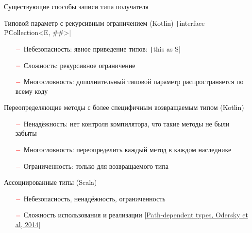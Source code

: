 \documentclass[usenames, dvipsnames]{beamer}
\begin{document}
\begin{frame}[fragile]{Существующие способы записи типа получателя}
        \begin{block}{Типовой параметр с рекурсивным ограничением (Kotlin)}
            \texttt|interface PCollection<E, ##>|
            \begin{itemize}
                \item[$\color{red} -$] Небезопасность: явное приведение типов: \texttt|this as S|
                \item[$\color{red} -$] Сложность: рекурсивное ограничение
                \item[$\color{red} -$] Многословность: дополнительный типовой параметр распространяется по всему коду
            \end{itemize}
        \end{block}

        \begin{block}{Переопределяющие методы с более специфичным возвращаемым типом (Kotlin)}
            \begin{itemize}
                \item[$\color{red} -$] Ненадёжность: нет контроля компилятора, что такие методы не были забыты
                \item[$\color{red} -$] Многословность: переопределить каждый метод в каждом наследнике
                \item[$\color{red} -$] Ограниченность: только для возвращаемого типа
            \end{itemize}
        \end{block}

        \begin{block}{Ассоциированные типы (Scala)}
            \begin{itemize}
                \item[$\color{red} -$] Небезопасность, ненадёжность, ограниченность
                \item[$\color{red} -$] Сложность использования и реализации [\href{http://lampwww.epfl.ch/~amin/dot/fpdt_post.pdf}{Path-dependent types, Odersky et al, 2014}]
            \end{itemize}
        \end{block}
    \end{frame}
\end{document}
